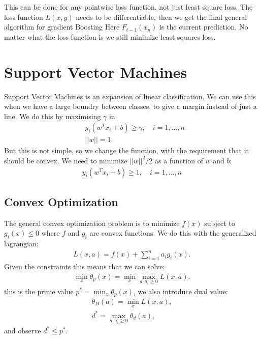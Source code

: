 \documentclass[a4paper,oneside,article]{memoir}
\begin{document}
This can be done for any pointwise loss function, not just least square loss. 
The loss function $L(x, y)$ needs to be differentiable, then we get the final general algorithm for gradient Boosting
Here $F_{t-1}(x_n)$ is the current prediction. No matter what the loss function is we still minimize least squares loss. 

\chapter{Support Vector Machines}
Support Vector Machines is an expansion of linear classification. 
We can use this when we have a large boundry between classes, to give a margin instead of just a line. 
We do this by maximising $γ$ in 
\begin{align*}
    &y_i(w^Tx_i+b)\geq γ, \quad i=1,...,n \\
    &||w|| = 1. 
\end{align*}
But this is not simple, so we change the function, with the requirement that it should be convex.
We need to minimize $||w||^2/2$ as a function of $w$ and $b$:
\begin{align*}
    y_i(w^Tx_i+b)\geq 1, \quad i=1,...,n
\end{align*}

\section{Convex Optimization}
The general convex optimization problem is to minimize $f(x)$ subject to $g_i(x) \leq 0$
where $f$ and $g_i$ are convex functions. 
We do this with the generalized lagrangian:
\begin{align*}
    L(x, a) = f(x) + \sum_{i=1}^{n}a_ig_i(x).
\end{align*}
Given the constraints this means that we can solve: 
\begin{align*}
    \min_x θ_p(x) = \min_x\max_{a: a_i \geq 0} L(x,a). 
\end{align*}
this is the prime value $p^* = \min_x θ_p(x)$, we also introduce dual value: 
\begin{align*}
    θ_D(a) = \min_x L(x,a), \\
    d^* = \max_{a: a_i \geq 0}θ_d(a),
\end{align*}
and observe $d^* \leq p^*$. 
\end{document}
